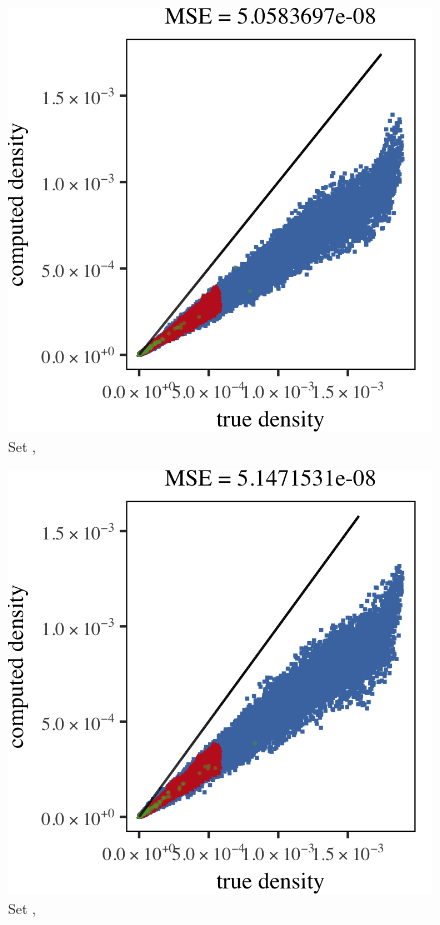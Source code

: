 
\begin{subfigure}{0.23\textwidth}
	\centering
	\includegraphics[keepaspectratio=true, width=\textwidth, height=0.23\textheight]{result/img/results_ferdosi_2_60000_mbe_silverman}
	\caption{Set \ferdosiTwo, \mbe}
	\label{fig:results:multisphere:mbe:ferdosi2}
\end{subfigure}
\begin{subfigure}{0.23\textwidth}
	\centering
	\includegraphics[keepaspectratio=true, width=\textwidth, height=0.23\textheight]{result/img/results_baakman_2_60000_mbe_silverman}
	\caption{Set \baakmanTwo, \mbe}
	\label{fig:results:multisphere:mbe:baakman2}
\end{subfigure}
